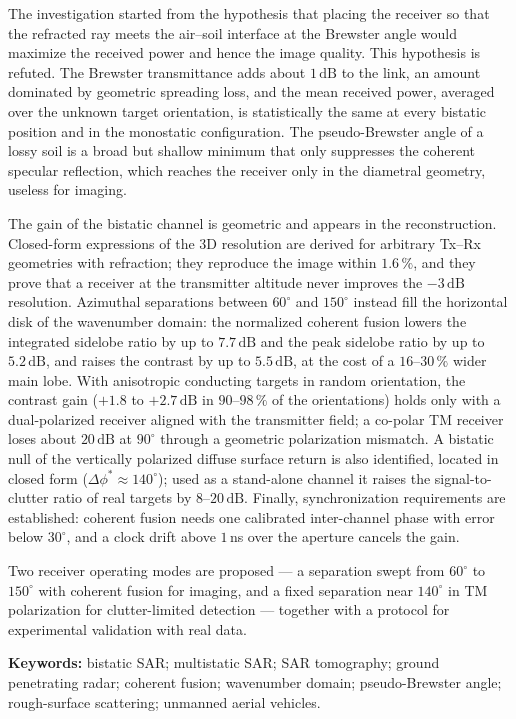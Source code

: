 \documentclass[12pt,a4paper,oneside]{book}
\theoremstyle{remark}
\newcommand{\dB}{\,\mathrm{dB}}
\theoremstyle{plain}
\theoremstyle{definition}
\begin{document}
The investigation started from the hypothesis that placing the receiver so
that the refracted ray meets the air--soil interface at the Brewster angle
would maximize the received power and hence the image quality. This hypothesis
is refuted. The Brewster transmittance adds about $1\dB$ to the link, an amount
dominated by geometric spreading loss, and the mean received power, averaged
over the unknown target orientation, is statistically the same at every
bistatic position and in the monostatic configuration. The pseudo-Brewster
angle of a lossy soil is a broad but shallow minimum that only suppresses the
coherent specular reflection, which reaches the receiver only in the
diametral geometry, useless for imaging.

The gain of the bistatic channel is geometric and appears in the
reconstruction. Closed-form expressions of the 3D resolution are derived for
arbitrary Tx--Rx geometries with refraction; they reproduce the image within
$1.6\,\%$, and they prove that a receiver at the transmitter altitude never
improves the $-3\dB$ resolution. Azimuthal separations between $60^\circ$ and
$150^\circ$ instead fill the horizontal disk of the wavenumber domain: the
normalized coherent fusion lowers the integrated sidelobe ratio by up to
$7.7\dB$ and the peak sidelobe ratio by up to $5.2\dB$, and raises the contrast
by up to $5.5\dB$, at the cost of a $16$--$30\,\%$ wider main lobe. With
anisotropic conducting targets in random orientation, the contrast gain
($+1.8$ to $+2.7\dB$ in $90$--$98\,\%$ of the orientations) holds only with a
dual-polarized receiver aligned with the transmitter field; a co-polar TM
receiver loses about $20\dB$ at $90^\circ$ through a geometric polarization
mismatch. A bistatic null of the vertically polarized diffuse surface return
is also identified, located in closed form ($\Delta\phi^\ast\approx140^\circ$);
used as a stand-alone channel it raises the signal-to-clutter ratio of real
targets by $8$--$20\dB$. Finally, synchronization requirements are
established: coherent fusion needs one calibrated inter-channel phase with
error below $30^\circ$, and a clock drift above $1\,$ns over the aperture
cancels the gain.

Two receiver operating modes are proposed --- a separation swept from
$60^\circ$ to $150^\circ$ with coherent fusion for imaging, and a fixed
separation near $140^\circ$ in TM polarization for clutter-limited detection
--- together with a protocol for experimental validation with real data.

\vspace{1em}
\noindent\textbf{Keywords:} bistatic SAR; multistatic SAR; SAR tomography;
ground penetrating radar; coherent fusion; wavenumber domain; pseudo-Brewster
angle; rough-surface scattering; unmanned aerial vehicles.
\end{document}
